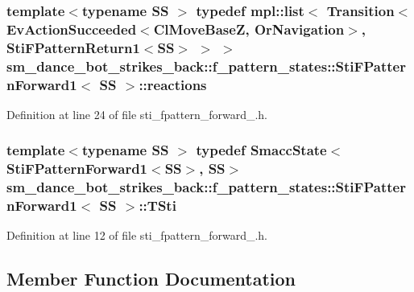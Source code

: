 \subsubsection[{\texorpdfstring{reactions}{reactions}}]{\setlength{\rightskip}{0pt plus 5cm}template$<$typename SS $>$ typedef mpl\+::list$<$ Transition$<$Ev\+Action\+Succeeded$<${\bf Cl\+Move\+BaseZ}, {\bf Or\+Navigation}$>$, {\bf Sti\+F\+Pattern\+Return1}$<$SS$>$ $>$ $>$ {\bf sm\+\_\+dance\+\_\+bot\+\_\+strikes\+\_\+back\+::f\+\_\+pattern\+\_\+states\+::\+Sti\+F\+Pattern\+Forward1}$<$ SS $>$\+::{\bf reactions}}\hypertarget{structsm__dance__bot__strikes__back_1_1f__pattern__states_1_1StiFPatternForward1_aecdba10117b77cc20781cd23bd77fe7e}{}\label{structsm__dance__bot__strikes__back_1_1f__pattern__states_1_1StiFPatternForward1_aecdba10117b77cc20781cd23bd77fe7e}


Definition at line 24 of file sti\+\_\+fpattern\+\_\+forward\+\_.\+h.

\subsubsection[{\texorpdfstring{T\+Sti}{TSti}}]{\setlength{\rightskip}{0pt plus 5cm}template$<$typename SS $>$ typedef {\bf Smacc\+State}$<${\bf Sti\+F\+Pattern\+Forward1}$<$SS$>$, SS$>$ {\bf sm\+\_\+dance\+\_\+bot\+\_\+strikes\+\_\+back\+::f\+\_\+pattern\+\_\+states\+::\+Sti\+F\+Pattern\+Forward1}$<$ SS $>$\+::{\bf T\+Sti}}\hypertarget{structsm__dance__bot__strikes__back_1_1f__pattern__states_1_1StiFPatternForward1_a30d04bd6c724d937fdbb5ca3f1ee3bbd}{}\label{structsm__dance__bot__strikes__back_1_1f__pattern__states_1_1StiFPatternForward1_a30d04bd6c724d937fdbb5ca3f1ee3bbd}


Definition at line 12 of file sti\+\_\+fpattern\+\_\+forward\+\_.\+h.



\subsection{Member Function Documentation}
